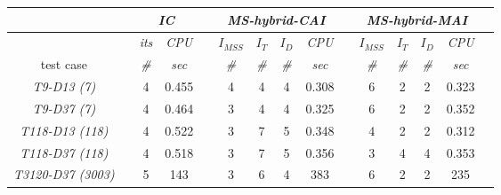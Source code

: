 \begin{table}[!ht]
\begin{adjustbox}{width=1\textwidth}
\begin{tabular}{@{}l c cc c  cccc c cccc c  @{}}
\toprule 
\end{tabular}
\end{adjustbox}
\begin{adjustbox}{width=1\textwidth} %
\small
\begin{tabular}{@{}l c cc c  cccc c cccc c  @{}}\toprule
                               && \multicolumn{2}{c}{\textit{IC}} &&     \multicolumn{4}{c}{\textit{MS-hybrid-CAI}} && \multicolumn{4}{c}{\textit{MS-hybrid-MAI}} \\ \midrule 
\multicolumn{1}{l}{}        && \textit{its}      & \textit{CPU} && $I_{MSS}$      & $I_T$   &  $I_D$      & \textit{CPU}     &&$I_{MSS}$      & $I_T$   &  $I_D$      & \textit{CPU}      \\
\cmidrule{3-4}  \cmidrule{6-9}  \cmidrule{11-14}   
\multicolumn{1}{c}{test case}      && \textit{\#}       & \textit{sec} && \textit{\#}      & \textit{\#}    & \textit{\#}       & \textit{sec}     && \textit{\#}        & \textit{\#}     &  \textit{\#}       & \textit{sec}  \\
\midrule
\multicolumn{1}{c}{\textit{T9-D13 (7)}}          && 4 & {0.455 } && 4      & 4  & 4 & 0.308 && 6     & 2  & 2 & 0.323  \\
\multicolumn{1}{c}{\textit{T9-D37 (7)}}          && 4 & 0.464    && 3      & 4  & 4 & 0.325 && 6     & 2  & 2 & 0.352  \\
\multicolumn{1}{c}{{\textit{T118-D13 (118)}}}    && 4 & 0.522    && 3      & 7  & 5 & 0.348 && 4     & 2  & 2 & {0.312} \\
\multicolumn{1}{c}{{\textit{T118-D37 (118)}}}    && 4 & 0.518    && 3      & 7  & 5 & 0.356 && 3     & 4  & 4 & {0.353}\\
\multicolumn{1}{c}{{\textit{T3120-D37 (3003)}}}  && 5 & 143      && 3      & 6  & 4 & 383   && 6     & 2  & 2 & {235}  \\
\toprule 
\end{tabular}
\end{adjustbox}
\end{table}